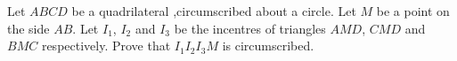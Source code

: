 Let $ABCD$ be a quadrilateral ,circumscribed about a circle. Let $M$ be a point on the side $AB$. Let $I_{1}$, $I_{2}$ and $I_{3}$ be the incentres of triangles $AMD$,  $CMD$ and $BMC$ respectively. Prove that $I_{1}I_{2}I_{3}M$ is circumscribed.